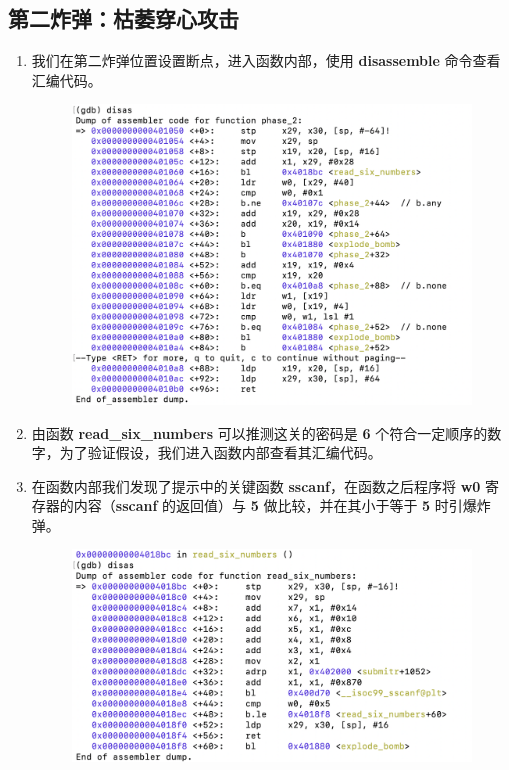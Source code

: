     \subsection{第二炸弹：枯萎穿心攻击}
        \begin{enumerate}
            \item 我们在第二炸弹位置设置断点，进入函数内部，使用 \textbf{disassemble} 命令查看汇编代码。
                \begin{figure}[htbp]
                    \centering
                    \includegraphics*[width = 12cm]{s2_0.png}
                \end{figure}
            \item 由函数 \textbf{read\_six\_numbers} 可以推测这关的密码是 \textbf{6} 个符合一定顺序的数字，为了验证假设，我们进入函数内部查看其汇编代码。
            \item 在函数内部我们发现了提示中的关键函数 \textbf{sscanf}，在函数之后程序将 \textbf{w0} 寄存器的内容（\textbf{sscanf} 的返回值）与 \textbf{5} 做比较，并在其小于等于 \textbf{5} 时引爆炸弹。
                \begin{figure}[htbp]
                    \centering
                    \includegraphics*[width = 12cm]{s2_1.png}

\end{figure}
\end{enumerate}
